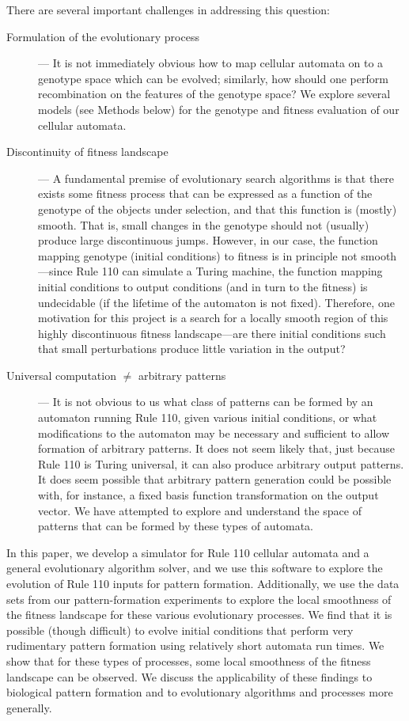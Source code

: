 \documentclass[twocolumn]{article}
\begin{document}
There are several important challenges in addressing this question:
\begin{description}
\item[Formulation of the evolutionary process] --- It is not immediately obvious how to map cellular automata on to a genotype space which can be evolved; similarly, how should one perform recombination on the features of the genotype space? We explore several models (see Methods below) for the genotype and fitness evaluation of our cellular automata. 
\item[Discontinuity of fitness landscape] ---  A fundamental premise of evolutionary search algorithms is that there exists some fitness process that can be expressed as a function of the genotype of the objects under selection, and that this function is (mostly) smooth. That is, small changes in the genotype should not (usually) produce large discontinuous jumps. However, in our case, the function mapping genotype (initial conditions) to fitness is in principle not smooth---since Rule 110 can simulate a Turing machine, the function mapping initial conditions to output conditions (and in turn to the fitness) is undecidable (if the lifetime of the automaton is not fixed). Therefore, one motivation for this project is a search for a locally smooth region of this highly discontinuous fitness landscape---are there initial conditions such that small perturbations produce little variation in the output?
\item[Universal computation $\ne$ arbitrary patterns] --- It is not obvious to us what class of patterns can be formed by an automaton running Rule 110, given various initial conditions, or what modifications to the automaton may be necessary and sufficient to allow formation of arbitrary patterns. It does not seem likely that, just because Rule 110 is Turing universal, it can also produce arbitrary output patterns. It does seem possible that arbitrary pattern generation could be possible with, for instance, a fixed basis function transformation on the output vector. We have attempted to explore and understand the space of patterns that can be formed by these types of automata.
\end{description}

In this paper, we develop a simulator for Rule 110 cellular automata and a general evolutionary algorithm solver, and we use this software to explore the evolution of Rule 110 inputs for pattern formation. Additionally, we use the data sets from our pattern-formation experiments to explore the local smoothness of the fitness landscape for these various evolutionary processes. We find that it is possible (though difficult) to evolve initial conditions that perform very rudimentary pattern formation using relatively short automata run times. We show that for these types of processes, some local smoothness of the fitness landscape can be observed. We discuss the applicability of these findings to biological pattern formation and to evolutionary algorithms and processes more generally.
\end{document}

